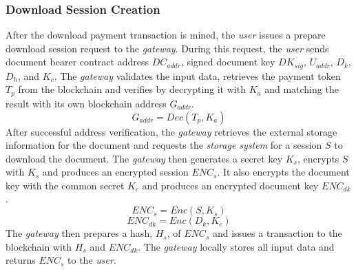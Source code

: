 \subsubsection{Download Session Creation}
After the download payment transaction is mined, the {\it user} issues a prepare download session request to the {\it gateway}. During this request, the {\it user} sends document bearer contract address $DC_{addr}$, signed document key $DK_{sig}$, $U_{addr}$, $D_k$, $D_{h}$, and $K_c$. The {\it gateway} validates the input data, retrieves the payment token $T_p$ from the blockchain and verifies by decrypting it with $K_a$ and matching the result with its own blockchain address $G_{addr}$. 
\begin{equation}
\label{eq-d-3}
G_{addr} = Dec (T_p, K_a)
\end{equation}
After successful address verification, the {\it gateway} retrieves the external storage information for the document and requests the {\it storage system} for a session $S$ to download the document. The {\it gateway} then generates a secret key $K_s$,  encrypts $S$ with $K_s$ and produces an encrypted session $ENC_s$. It also encrypts the document key with the common secret $K_c$ and produces an encrypted document key $ENC_{dk}$. 
\begin{equation}
\label{eq-d-4} 
ENC_s = Enc (S, K_s)
\end{equation}
\begin{equation}
\label{eq-d-5} 
ENC_{dk} = Enc (D_k, K_c)
\end{equation}
The {\it gateway} then prepares a hash, $H_s$, of $ENC_s$ and issues a transaction to the blockchain with $H_s$ and $ENC_{dk}$. The {\it gateway} locally stores all input data and returns $ENC_s$ to the {\it user}.

